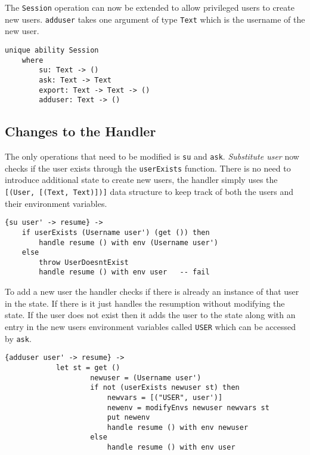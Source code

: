 \documentclass[logo,bsc,singlespacing,parskip]{infthesis}
\begin{document}
The \texttt{Session} operation can now be extended to allow privileged users to
create new users. \texttt{adduser} takes one argument of type \texttt{Text}
which is the username of the new user.

\begin{lstlisting}[language=unison]
unique ability Session
    where
        su: Text -> ()
        ask: Text -> Text
        export: Text -> Text -> ()
        adduser: Text -> ()
\end{lstlisting}

\subsection{Changes to the Handler}

The only operations that need to be modified is \texttt{su} and \texttt{ask}.
\emph{Substitute user} now checks if the user exists through the
\texttt{userExists} function. There is no need to introduce additional state to
create new users, the handler simply uses the \texttt{[(User, [(Text, Text)])]}
data structure to keep track of both the users and their environment variables.

\begin{lstlisting}[language=unison]
{su user' -> resume} -> 
    if userExists (Username user') (get ()) then
        handle resume () with env (Username user')
    else 
        throw UserDoesntExist
        handle resume () with env user   -- fail
\end{lstlisting}

To add a new user the handler checks if there is already an instance of that
user in the state. If there is it just handles the resumption without modifying
the state. If the user does not exist then it adds the user to the state along
with an entry in the new users environment variables called \texttt{USER} which
can be accessed by \texttt{ask}.

\begin{lstlisting}[language=unison]
{adduser user' -> resume} ->
            let st = get ()
                    newuser = (Username user')
                    if not (userExists newuser st) then
                        newvars = [("USER", user')]
                        newenv = modifyEnvs newuser newvars st
                        put newenv
                        handle resume () with env newuser
                    else 
                        handle resume () with env user

\end{lstlisting}
\end{document}
